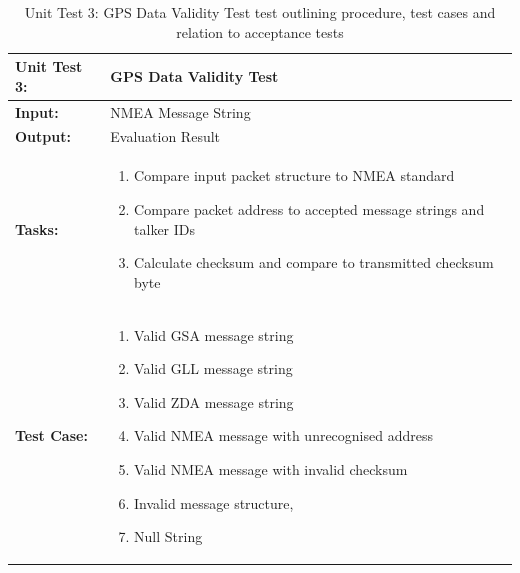 \begin{table}[H]
    \centering
    \caption{Unit Test 3: GPS Data Validity Test  test outlining procedure, test cases and relation to acceptance tests}
    \begin{tabular}{|m{}|m{}|}
    \hline
       \textbf{Unit Test 3: }  &  GPS Data Validity Test\\
       \hline
        \textbf{Input: } &  NMEA Message String\\
        \hline
        \textbf{Output: } & Evaluation Result\\
        \hline
        \textbf{Tasks: } & \begin{enumerate}
        \vspace{1mm}
            \item Compare input packet structure to NMEA standard
            \item Compare packet address to accepted message strings and talker IDs
            \item Calculate checksum and compare to transmitted checksum byte
        \end{enumerate}\\
        \hline
        \textbf{Test Case: } & \begin{enumerate}
            \vspace{1mm}
            \item Valid GSA message string
            \item Valid GLL message string
            \item Valid ZDA message string
            \item Valid NMEA message with unrecognised address
            \item Valid NMEA message with invalid checksum
            \item Invalid message structure,
            \item Null String
        \end{enumerate}\\
        \hline
    \end{tabular}

    \label{tab:UT003}
\end{table}

